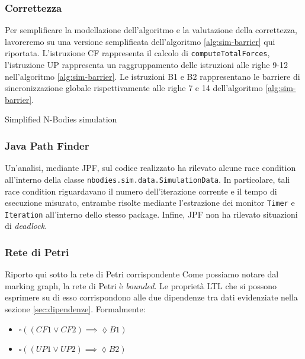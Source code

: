 \documentclass[report]{subfiles}
\begin{document}
	\subsubsection{Correttezza}
	\begin{minipage}{.55\textwidth}
		Per semplificare la modellazione dell'algoritmo e la valutazione della correttezza, lavoreremo su una versione semplificata dell'algoritmo \ref{alg:sim-barrier} qui riportata. L'istruzione CF rappresenta il calcolo di \texttt{computeTotalForces}, l'istruzione UP rappresenta un raggruppamento delle istruzioni alle righe 9-12 nell'algoritmo \ref{alg:sim-barrier}. Le istruzioni B1 e B2 rappresentano le barriere di sincronizzazione globale rispettivamente alle righe 7 e 14 dell'algoritmo \ref{alg:sim-barrier}.
	\end{minipage}
	\hfill
	\begin{minipage}{.4\textwidth}
		\begin{algorithm}[H]
			\caption{Simplified N-Bodies simulation}
		\end{algorithm}
	\end{minipage}
	\hfill
	
	\subsubsection{Java Path Finder}
	Un'analisi, mediante JPF, sul codice realizzato ha rilevato alcune race condition all'interno della classe \texttt{nbodies.sim.data.SimulationData}. In particolare, tali race condition riguardavano il numero dell'iterazione corrente e il tempo di esecuzione misurato, entrambe risolte mediante l'estrazione dei monitor \texttt{Timer} e \texttt{Iteration} all'interno dello stesso package. Infine, JPF non ha rilevato situazioni di \textit{deadlock}.
	
	\subsubsection{Rete di Petri}
	Riporto qui sotto la rete di Petri corrispondente
	Come possiamo notare dal marking graph, la rete di Petri è \textit{bounded}. Le proprietà LTL che si possono esprimere su di esso corrispondono alle due dipendenze tra dati evidenziate nella sezione \ref{sec:dipendenze}. Formalmente:
	\begin{itemize}
		\item $\square ((CF1 \vee CF2) \implies \lozenge B1)$
		\item $\square ((UP1 \vee UP2) \implies \lozenge B2)$
	\end{itemize}
	
\end{document}
